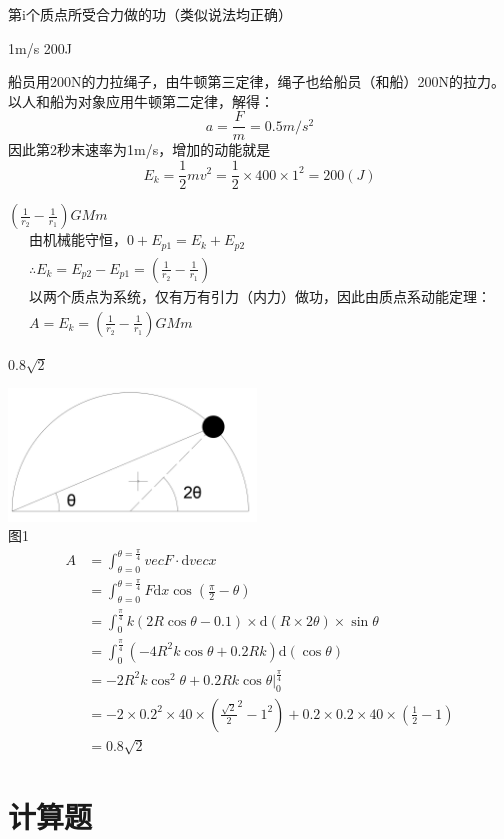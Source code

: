 \documentclass[b5paper,opensource]{qyxf-book}
\newcommand{\di}[1]{\mathrm{d}#1}
\begin{document}
第i个质点所受合力做的功（类似说法均正确）

1m/s \qquad 200J

船员用200N的力拉绳子，由牛顿第三定律，绳子也给船员（和船）200N的拉力。以人和船为对象应用牛顿第二定律，解得：
\[a=\frac{F}{m}=0.5m/s^2\]
因此第2秒末速率为1m/s，增加的动能就是
\[E_k=\frac{1}{2}mv^2=\frac{1}{2}\times400\times1^2=200(J)\]

$\left(\frac{1}{r_2}-\frac{1}{r_1}\right)GMm$ 
\begin{gather*}
\text{由机械能守恒，}0+E_{p1}=E_k+E_{p2}\\
\therefore E_k=E_{p2}-E_{p1}=\left(\frac{1}{r_2}-\frac{1}{r_1}\right)\\
\text{以两个质点为系统，仅有万有引力（内力）做功，因此由质点系动能定理：}\\
A=E_k=\left(\frac{1}{r_2}-\frac{1}{r_1}\right)GMm
\end{gather*}

$0.8\sqrt{2}$

{\centering\includegraphics[height=100pt]{Chp2_illus1.png}}\\
图1
\begin{align*}
A	&=\int_{\theta=0}^{\theta=\frac{\pi}{4}}{vec{F}}\cdot\di{vec{x}}\\
&=\int_{\theta=0}^{\theta=\frac{\pi}{4}}F\di{x}\cos\left(\frac{\pi}{2}-\theta\right)\\
&=\int_{0}^{\frac{\pi}{4}}k(2R\cos\theta-0.1)\times\di{(R\times 2\theta)}\times\sin\theta\\
&=\int_{0}^{\frac{\pi}{4}}(-4R^2k\cos\theta+0.2Rk)\di{(\cos\theta)}\\
&=-2R^2k\cos^2\theta+0.2Rk\cos\theta\left.\right|_0^{\frac{\pi}{4}}\\
&=-2\times 0.2^2\times 40\times({\frac{\sqrt{2}}{2}}^2-1^2)+0.2\times 0.2\times 40\times(\frac{1}{2}-1)\\
&=0.8\sqrt{2}
\end{align*}


\section{计算题}
\end{document}
